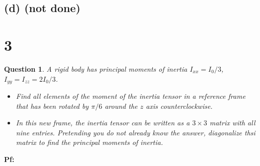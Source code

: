 \documentclass{article}
\newtheorem{question}{Question}
\begin{document}
\subsection*{(d) (not done)}

\break

\section*{3}
\begin{question}\label{q3}
    A rigid body has principal moments of inertia $I_{xx}=I_0/3$, $I_{yy}=I_{zz}=2I_0/3$.
    \begin{itemize}
        \item[(a)] Find all elements of the moment of the inertia tensor in a reference frame that has been rotated by $\pi/6$ around the $z$ axis counterclockwise.
        \item[(b)] In this new frame, the inertia tensor can be written as a $3\times 3$ matrix with all nine entries. Pretending you do not already know the answer, diagonalize thsi matrix to find the principal moments of inertia. 
    \end{itemize}
\end{question}

\textbf{Pf:}
\end{document}
